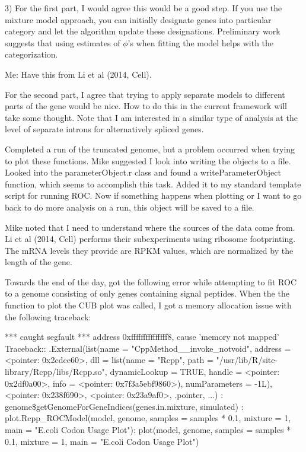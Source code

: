 \documentclass[11pt]{labbook}
\begin{document}
3) For the first part, I would agree this would be a good step. If you use the mixture model approach, you can initially designate genes into particular category and let the algorithm update these designations.  Preliminary work 
suggests that using estimates of $\phi$'s when fitting the model helps with the categorization.

Me: Have this from Li et al (2014, Cell). 

For the second part, I agree that trying to apply separate models to different parts of the gene would be nice.  How to do this in the current framework will take some thought.  Note that I am interested in a similar type of analysis at the level of separate introns for alternatively spliced 
genes. 

Completed a run of the truncated genome, but a problem occurred when trying to plot these functions. Mike suggested I look into writing the objects to a file. Looked into the parameterObject.r class and found a writeParameterObject function, which seems to accomplish this task. Added it to my standard template script for running ROC. Now if something happens when plotting or I want to go back to do more analysis on a run, this object will be saved to a file. 

Mike noted that I need to understand where the sources of the data come from. Li et al (2014, Cell) performs their subexperiments using ribosome footprinting. The mRNA levels they provide are RPKM values, which are normalized by the length of the gene. 


Towards the end of the day, got the following error while attempting to fit ROC to a genome consisting of only genes containing signal peptides. When the the function to plot the CUB plot was called, I got a memory allocation issue with the following traceback:

*** caught segfault ***
address 0xfffffffffffffff8, cause 'memory not mapped'
\newline
Traceback:: .External(list(name = "CppMethod\_\_invoke\_notvoid", address = <pointer: 0x2cdce60>,     dll = list(name = "Rcpp", path = "/usr/lib/R/site-library/Rcpp/libs/Rcpp.so",         dynamicLookup = TRUE, handle = <pointer: 0x2df0a00>,         info = <pointer: 0x7f3a5ebf9860>), numParameters = -1L),     <pointer: 0x238f690>, <pointer: 0x23a9af0>, .pointer, ...)
: genome\$getGenomeForGeneIndices(genes.in.mixture, simulated)
: plot.Rcpp\_ROCModel(model, genome, samples = samples * 0.1, mixture = 1,     main = "E.coli Codon Usage Plot"): plot(model, genome, samples = samples * 0.1, mixture = 1, main = "E.coli Codon Usage Plot")
 \newline
 
\end{document}
